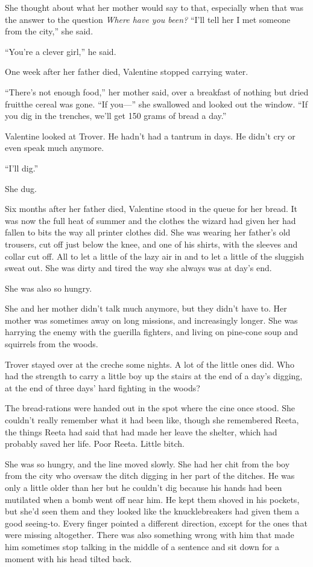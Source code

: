She thought about what her mother would say to that, especially
when that was the answer to the question
\emph{Where have you been?} “I’ll tell her I met someone from the
city,” she said.

“You’re a clever girl,” he said.

\tb

One week after her father died, Valentine stopped carrying water.

“There’s not enough food,” her mother said, over a breakfast of
nothing but dried fruit\dash{}the cereal was gone. “If you---” she
swallowed and looked out the window. “If you dig in the trenches,
we’ll get 150 grams of bread a day.”

Valentine looked at Trover. He hadn’t had a tantrum in days. He
didn’t cry or even speak much anymore.

“I’ll dig.”

She dug.

\tb

Six months after her father died, Valentine stood in the queue for
her bread. It was now the full heat of summer and the clothes the
wizard had given her had fallen to bits the way all printer clothes
did. She was wearing her father’s old trousers, cut off just below
the knee, and one of his shirts, with the sleeves and collar cut
off. All to let a little of the lazy air in and to let a little of
the sluggish sweat out. She was dirty and tired the way she always
was at day’s end.

She was also so hungry.

She and her mother didn’t talk much anymore, but they didn’t have
to. Her mother was sometimes away on long missions, and
increasingly longer. She was harrying the enemy with the guerilla
fighters, and living on pine-cone soup and squirrels from the
woods.

Trover stayed over at the creche some nights. A lot of the little
ones did. Who had the strength to carry a little boy up the stairs
at the end of a day’s digging, at the end of three days’ hard
fighting in the woods?

The bread-rations were handed out in the spot where the cine once
stood. She couldn’t really remember what it had been like, though
she remembered Reeta, the things Reeta had said that had made her
leave the shelter, which had probably saved her life. Poor Reeta.
Little bitch.

She was so hungry, and the line moved slowly. She had her chit from
the boy from the city who oversaw the ditch digging in her part of
the ditches. He was only a little older than her but he couldn’t
dig because his hands had been mutilated when a bomb went off near
him. He kept them shoved in his pockets, but she’d seen them and
they looked like the knucklebreakers had given them a good
seeing-to. Every finger pointed a different direction, except for
the ones that were missing altogether. There was also something
wrong with him that made him sometimes stop talking in the middle
of a sentence and sit down for a moment with his head tilted back.

